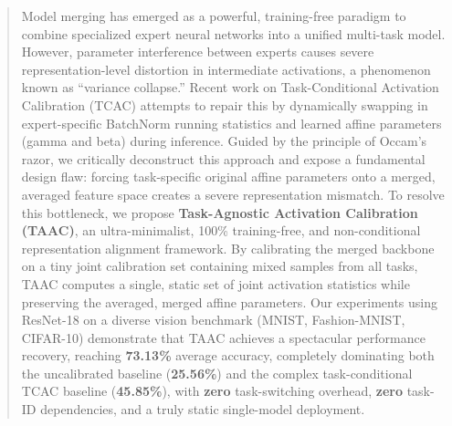 \documentclass{article}
\theoremstyle{plain}
\theoremstyle{definition}
\theoremstyle{remark}
\begin{document}

\printAffiliationsAndNotice{}

\makeatletter
\gdef\@icmltitlerunning{Deconstructing Activation Calibration}
\makeatother

\begin{abstract}
Model merging has emerged as a powerful, training-free paradigm to combine specialized expert neural networks into a unified multi-task model. However, parameter interference between experts causes severe representation-level distortion in intermediate activations, a phenomenon known as ``variance collapse.'' Recent work on Task-Conditional Activation Calibration (TCAC) attempts to repair this by dynamically swapping in expert-specific BatchNorm running statistics and learned affine parameters (gamma and beta) during inference. Guided by the principle of Occam's razor, we critically deconstruct this approach and expose a fundamental design flaw: forcing task-specific original affine parameters onto a merged, averaged feature space creates a severe representation mismatch. To resolve this bottleneck, we propose \textbf{Task-Agnostic Activation Calibration (TAAC)}, an ultra-minimalist, 100\% training-free, and non-conditional representation alignment framework. By calibrating the merged backbone on a tiny joint calibration set containing mixed samples from all tasks, TAAC computes a single, static set of joint activation statistics while preserving the averaged, merged affine parameters. Our experiments using ResNet-18 on a diverse vision benchmark (MNIST, Fashion-MNIST, CIFAR-10) demonstrate that TAAC achieves a spectacular performance recovery, reaching \textbf{73.13\%} average accuracy, completely dominating both the uncalibrated baseline (\textbf{25.56\%}) and the complex task-conditional TCAC baseline (\textbf{45.85\%}), with \textbf{zero} task-switching overhead, \textbf{zero} task-ID dependencies, and a truly static single-model deployment.
\end{abstract}
\end{document}
